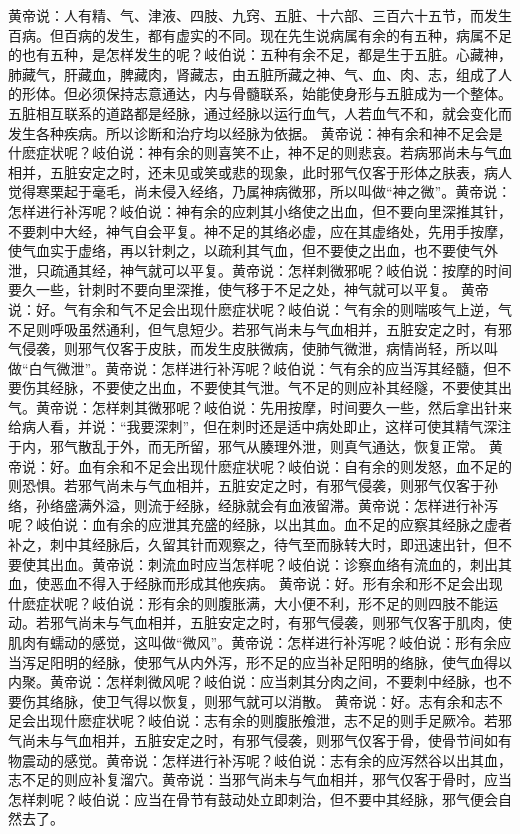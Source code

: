 \documentclass[a4paper,12pt,UTF8,twoside]{ctexbook}
\begin{document}
黄帝说：人有精、气、津液、四肢、九窍、五脏、十六部、三百六十五节，而发生百病。但百病的发生，都有虚实的不同。现在先生说病属有余的有五种，病属不足的也有五种，是怎样发生的呢？岐伯说：五种有余不足，都是生于五脏。心藏神，肺藏气，肝藏血，脾藏肉，肾藏志，由五脏所藏之神、气、血、肉、志，组成了人的形体。但必须保持志意通达，内与骨髓联系，始能使身形与五脏成为一个整体。五脏相互联系的道路都是经脉，通过经脉以运行血气，人若血气不和，就会变化而发生各种疾病。所以诊断和治疗均以经脉为依据。
黄帝说：神有余和神不足会是什麽症状呢？岐伯说：神有余的则喜笑不止，神不足的则悲哀。若病邪尚未与气血相并，五脏安定之时，还未见或笑或悲的现象，此时邪气仅客于形体之肤表，病人觉得寒栗起于毫毛，尚未侵入经络，乃属神病微邪，所以叫做“神之微”。黄帝说：怎样进行补泻呢？岐伯说：神有余的应刺其小络使之出血，但不要向里深推其针，不要刺中大经，神气自会平复。神不足的其络必虚，应在其虚络处，先用手按摩，使气血实于虚络，再以针刺之，以疏利其气血，但不要使之出血，也不要使气外泄，只疏通其经，神气就可以平复。黄帝说：怎样刺微邪呢？岐伯说：按摩的时间要久一些，针刺时不要向里深推，使气移于不足之处，神气就可以平复。
黄帝说：好。气有余和气不足会出现什麽症状呢？岐伯说：气有余的则喘咳气上逆，气不足则呼吸虽然通利，但气息短少。若邪气尚未与气血相并，五脏安定之时，有邪气侵袭，则邪气仅客于皮肤，而发生皮肤微病，使肺气微泄，病情尚轻，所以叫做“白气微泄”。黄帝说：怎样进行补泻呢？岐伯说：气有余的应当泻其经髓，但不要伤其经脉，不要使之出血，不要使其气泄。气不足的则应补其经隧，不要使其出气。黄帝说：怎样刺其微邪呢？岐伯说：先用按摩，时间要久一些，然后拿出针来给病人看，并说：“我要深刺”，但在刺时还是适中病处即止，这样可使其精气深注于内，邪气散乱于外，而无所留，邪气从腠理外泄，则真气通达，恢复正常。
黄帝说：好。血有余和不足会出现什麽症状呢？岐伯说：自有余的则发怒，血不足的则恐惧。若邪气尚未与气血相并，五脏安定之时，有邪气侵袭，则邪气仅客于孙络，孙络盛满外溢，则流于经脉，经脉就会有血液留滞。黄帝说：怎样进行补泻呢？岐伯说：血有余的应泄其充盛的经脉，以出其血。血不足的应察其经脉之虚者补之，刺中其经脉后，久留其针而观察之，待气至而脉转大时，即迅速出针，但不要使其出血。黄帝说：刺流血时应当怎样呢？岐伯说：诊察血络有流血的，刺出其血，使恶血不得入于经脉而形成其他疾病。
黄帝说：好。形有余和形不足会出现什麽症状呢？岐伯说：形有余的则腹胀满，大小便不利，形不足的则四肢不能运动。若邪气尚未与气血相并，五脏安定之时，有邪气侵袭，则邪气仅客于肌肉，使肌肉有蠕动的感觉，这叫做“微风”。黄帝说：怎样进行补泻呢？岐伯说：形有余应当泻足阳明的经脉，使邪气从内外泻，形不足的应当补足阳明的络脉，使气血得以内聚。黄帝说：怎样刺微风呢？岐伯说：应当刺其分肉之间，不要刺中经脉，也不要伤其络脉，使卫气得以恢复，则邪气就可以消散。
黄帝说：好。志有余和志不足会出现什麽症状呢？岐伯说：志有余的则腹胀飧泄，志不足的则手足厥冷。若邪气尚未与气血相并，五脏安定之时，有邪气侵袭，则邪气仅客于骨，使骨节间如有物震动的感觉。黄帝说：怎样进行补泻呢？岐伯说：志有余的应泻然谷以出其血，志不足的则应补复溜穴。黄帝说：当邪气尚未与气血相并，邪气仅客于骨时，应当怎样刺呢？岐伯说：应当在骨节有鼓动处立即刺治，但不要中其经脉，邪气便会自然去了。
\end{document}

